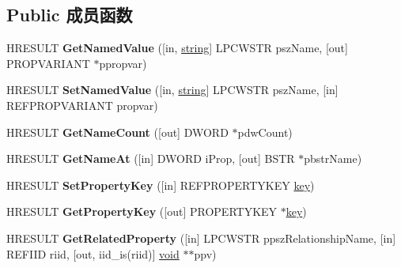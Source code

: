 \subsection*{Public 成员函数}
\begin{DoxyCompactItemize}
\item 
\mbox{\label{interfacev1__enum_ad9103d8b30061ddfd5fb9e5c7dae6893}} 
H\+R\+E\+S\+U\+LT {\bfseries Get\+Named\+Value} (\mbox{[}in, \hyperlink{structstring}{string}\mbox{]} L\+P\+C\+W\+S\+TR psz\+Name, \mbox{[}out\mbox{]} P\+R\+O\+P\+V\+A\+R\+I\+A\+NT $\ast$ppropvar)
\item 
\mbox{\label{interfacev1__enum_a2cc18951410fe15b91e33fcfb1373f4a}} 
H\+R\+E\+S\+U\+LT {\bfseries Set\+Named\+Value} (\mbox{[}in, \hyperlink{structstring}{string}\mbox{]} L\+P\+C\+W\+S\+TR psz\+Name, \mbox{[}in\mbox{]} R\+E\+F\+P\+R\+O\+P\+V\+A\+R\+I\+A\+NT propvar)
\item 
\mbox{\label{interfacev1__enum_aa4feea240ae823bab10646eb4ed36858}} 
H\+R\+E\+S\+U\+LT {\bfseries Get\+Name\+Count} (\mbox{[}out\mbox{]} D\+W\+O\+RD $\ast$pdw\+Count)
\item 
\mbox{\label{interfacev1__enum_ac6db8e7d0001cf255494f962c432b8bd}} 
H\+R\+E\+S\+U\+LT {\bfseries Get\+Name\+At} (\mbox{[}in\mbox{]} D\+W\+O\+RD i\+Prop, \mbox{[}out\mbox{]} B\+S\+TR $\ast$pbstr\+Name)
\item 
\mbox{\label{interfacev1__enum_ad9ea7b61cc4db0d5f52a613b4c3a0746}} 
H\+R\+E\+S\+U\+LT {\bfseries Set\+Property\+Key} (\mbox{[}in\mbox{]} R\+E\+F\+P\+R\+O\+P\+E\+R\+T\+Y\+K\+EY \hyperlink{structkey}{key})
\item 
\mbox{\label{interfacev1__enum_af14e0ee7afc497fe27804d596428453f}} 
H\+R\+E\+S\+U\+LT {\bfseries Get\+Property\+Key} (\mbox{[}out\mbox{]} P\+R\+O\+P\+E\+R\+T\+Y\+K\+EY $\ast$\hyperlink{structkey}{key})
\item 
\mbox{\label{interfacev1__enum_a7a56622d665b6ab79b2f4ebc4c8446f8}} 
H\+R\+E\+S\+U\+LT {\bfseries Get\+Related\+Property} (\mbox{[}in\mbox{]} L\+P\+C\+W\+S\+TR ppsz\+Relationship\+Name, \mbox{[}in\mbox{]} R\+E\+F\+I\+ID riid, \mbox{[}out, iid\+\_\+is(riid)\mbox{]} \hyperlink{interfacevoid}{void} $\ast$$\ast$ppv)
$$
\end{DoxyCompactItemize}
